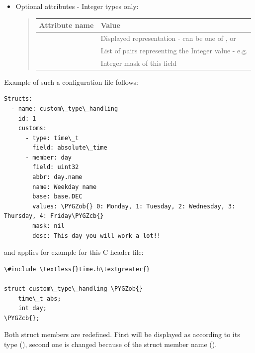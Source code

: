 \documentclass[A4paper,10pt,english]{sphinxmanual}
\def\PYGZob{\char`\{}
\def\PYGZcb{\char`\}}
\begin{document}
\label{user/config:below}\begin{itemize}
\item {} 
Optional attributes - Integer types only:
\begin{quote}

\begin{tabulary}{\linewidth}{|L|L|}
\hline
\textbf{
Attribute name
} & \textbf{
Value
}\\\hline

 & 
Displayed representation - can be one of ,  or 
\\\hline

 & 
List of  pairs representing the Integer value - e.g. 
\\\hline

 & 
Integer mask of this field
\\\hline
\end{tabulary}

\end{quote}

\end{itemize}

Example of such a configuration file follows:

\begin{Verbatim}[commandchars=\\\{\}]
Structs:
  - name: custom\_type\_handling
    id: 1
    customs:
      - type: time\_t
        field: absolute\_time
      - member: day
        field: uint32
        abbr: day.name
        name: Weekday name
        base: base.DEC
        values: \PYGZob{} 0: Monday, 1: Tuesday, 2: Wednesday, 3: Thursday, 4: Friday\PYGZcb{}
        mask: nil
        desc: This day you will work a lot!!
\end{Verbatim}

and applies for example for this C header file:

\begin{Verbatim}[commandchars=\\\{\}]
\#include \textless{}time.h\textgreater{}

struct custom\_type\_handling \PYGZob{}
    time\_t abs;
    int day;
\PYGZcb{};
\end{Verbatim}

Both struct members are redefined. First will be displayed as  according to its type (), second one is changed because of the struct member name ().
\end{document}
